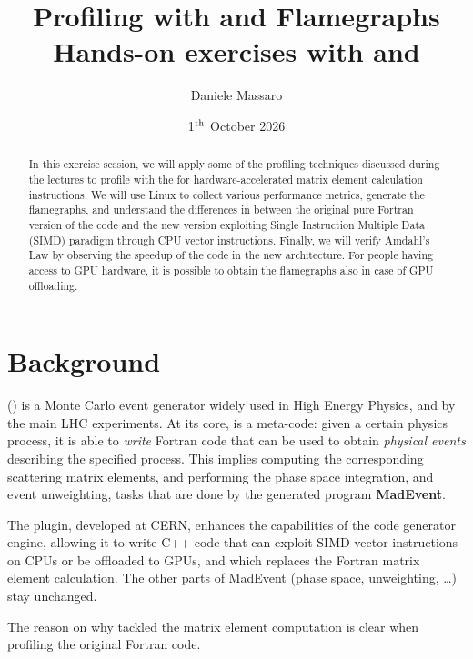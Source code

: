 \documentclass[11pt,a4paper]{article}
\title{Profiling with \perf and Flamegraphs\\[0.2em]
\large Hands-on exercises with \madgraph and \cudacpp}
\author{Daniele Massaro}
\date{1$^\textup{th}$ October 2026}
\begin{document}
\maketitle
\thispagestyle{empty}

\begin{abstract}
    In this exercise session, we will apply some of the profiling techniques discussed during the lectures to profile \madgraph with the \cudacpp for hardware-accelerated matrix element calculation instructions.
    We will use Linux \perf to collect various performance metrics, generate the flamegraphs, and understand the differences in between the original pure Fortran version of the code and the new version exploiting Single Instruction Multiple Data (SIMD) paradigm through CPU vector instructions.
    Finally, we will verify Amdahl's Law by observing the speedup of the code in the new architecture.
    For people having access to GPU hardware, it is possible to obtain the flamegraphs also in case of GPU offloading.
\end{abstract}

\tableofcontents
\newpage

\section{Background}

\madgraph (\mgamc) is a Monte Carlo event generator widely used in High Energy Physics, and by the main LHC experiments.
At its core, \mgamc is a meta-code: given a certain physics process, it is able to \emph{write} Fortran code that can be used to obtain \emph{physical events} describing the specified process.
This implies computing the corresponding scattering matrix elements, and performing the phase space integration, and event unweighting, tasks that are done by the generated program \textbf{MadEvent}.

The \textbf{\cudacpp} plugin, developed at CERN, enhances the capabilities of the code generator engine, allowing it to write C++ code that can exploit SIMD vector instructions on CPUs or be offloaded to GPUs, and which replaces the Fortran matrix element calculation.
The other parts of MadEvent (phase space, unweighting, \dots) stay unchanged.

The reason on why \cudacpp tackled the matrix element computation is clear when profiling the original Fortran code.
\end{document}

